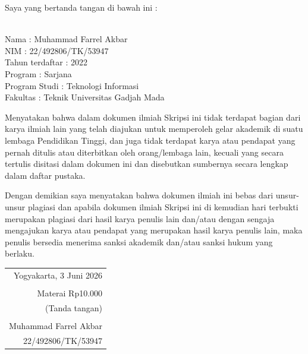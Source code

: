 \noindent Saya yang bertanda tangan di bawah ini :

\vspace{-1em}

\begin{tabbing}
\hspace{40mm} \= \\ %
\noindent Nama \> : Muhammad Farrel Akbar\\[\parskip]
\noindent NIM \> :  22/492806/TK/53947\\[\parskip]
\noindent Tahun terdaftar \> : 2022 \\[\parskip]
\noindent Program \> : Sarjana \\[\parskip]
\noindent Program Studi \> : Teknologi Informasi \\[\parskip]
\noindent Fakultas \> : Teknik Universitas Gadjah Mada
\end{tabbing}

\noindent Menyatakan bahwa dalam dokumen ilmiah Skripsi ini tidak terdapat bagian dari karya ilmiah lain yang telah diajukan untuk memperoleh gelar akademik di suatu lembaga Pendidikan Tinggi, dan juga tidak terdapat karya atau pendapat yang pernah ditulis atau diterbitkan oleh orang/lembaga lain, kecuali yang secara tertulis disitasi dalam dokumen ini dan disebutkan sumbernya secara lengkap dalam daftar pustaka.

\noindent Dengan demikian saya menyatakan bahwa dokumen ilmiah ini bebas dari unsur-unsur plagiasi dan apabila dokumen ilmiah Skripsi ini di kemudian hari terbukti merupakan plagiasi dari hasil karya penulis lain dan/atau dengan sengaja mengajukan karya atau pendapat yang merupakan hasil karya penulis lain, maka penulis bersedia menerima sanksi akademik dan/atau sanksi hukum yang berlaku.


\begin{flushright}
	\begin{tabular}{r}
		Yogyakarta, 3 Juni 2026 \\
		\vspace{0.1cm} \\
		\tiny{Materai Rp10.000} \\
		\tiny{(Tanda tangan)} \\	
		\vspace{0.1cm} \\
		Muhammad Farrel Akbar \\ 22/492806/TK/53947
	\end{tabular}
\end{flushright}